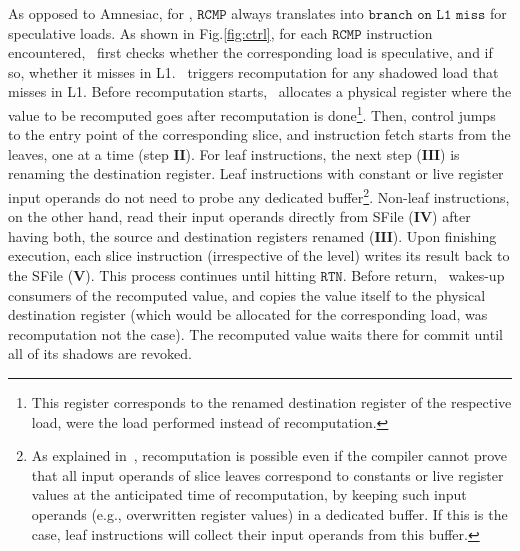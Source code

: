 As opposed to Amnesiac, for \arch, $\texttt{RCMP}$ always translates into $\texttt{branch on L1 miss}$ for speculative loads. 
As shown in Fig.\ref{fig:ctrl}, for each $\texttt{RCMP}$ instruction encountered, \arch\ first checks whether the corresponding load is speculative, and if so, whether it misses in L1. \arch\ triggers recomputation for any shadowed load that misses in L1.
Before recomputation starts, \arch\ allocates a physical register where the value to be recomputed goes after recomputation is done\footnote{This register corresponds to the renamed destination register of the respective load, were the load performed instead of recomputation.}.  
Then, control jumps to the entry point of the corresponding slice, and instruction fetch starts from the leaves, one at a time (step $\textbf{II}$). For leaf instructions, the next step ($\textbf{III}$) is renaming the destination register. 
Leaf instructions with constant or live
register input operands do not need to probe any dedicated buffer\footnote{As explained in~\cite{amnesiac17}, recomputation is possible even if the compiler cannot prove that all input operands of
slice leaves correspond to constants or live register values at the anticipated
time of recomputation, by keeping such input operands (e.g., overwritten register values) in a dedicated buffer. If this is the case, leaf instructions will collect their input operands from this buffer.
}.  
%
Non-leaf instructions, on the other hand, 
read their input operands directly from SFile ($\textbf{IV}$)
after having both, the
source and destination registers renamed ($\textbf{III}$).
Upon finishing execution, each slice instruction (irrespective of the level) writes
its result back to the SFile ($\textbf{V}$). 
This process continues until hitting $\texttt{RTN}$. Before return, \arch\ wakes-up consumers of the recomputed value, and copies the value itself to the physical destination register (which would be allocated for the corresponding load, was recomputation not the case).  The recomputed value  waits there for commit until all of its shadows are revoked. 

